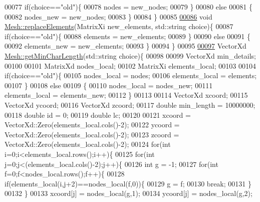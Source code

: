 \begin{DoxyCode}
00077     \textcolor{keywordflow}{if}(choice==\textcolor{stringliteral}{"old"})\{
00078         nodes = new\_nodes;
00079     \}
00080     \textcolor{keywordflow}{else}
00081     \{
00082         nodes\_new = new\_nodes;
00083     \}
00084 \}
00085 
\hyperlink{class_mesh_a95ba7a96ec42ea4e0c191890f7faa2ab}{00086} \textcolor{keywordtype}{void} \hyperlink{class_mesh_a95ba7a96ec42ea4e0c191890f7faa2ab}{Mesh::replaceElements}(MatrixXi new\_elements, std::string choice)\{
00087     \textcolor{keywordflow}{if}(choice==\textcolor{stringliteral}{"old"})\{
00088         elements = new\_elements;
00089     \}
00090     \textcolor{keywordflow}{else}
00091     \{
00092         elements\_new = new\_elements;
00093     \}
00094 \}
00095 
\hyperlink{class_mesh_a94ce58cb2598b1db2973ad357dae2710}{00097} VectorXd \hyperlink{class_mesh_a94ce58cb2598b1db2973ad357dae2710}{Mesh::getMinCharLength}(std::string choice)\{
00098 
00099     VectorXd min\_details;
00100 
00101     MatrixXd nodes\_local;
00102     MatrixXi elements\_local;
00103 
00104     \textcolor{keywordflow}{if}(choice==\textcolor{stringliteral}{"old"})\{
00105         nodes\_local = nodes;
00106         elements\_local = elements;
00107     \}
00108     \textcolor{keywordflow}{else}
00109     \{
00110         nodes\_local = nodes\_new;
00111         elements\_local = elements\_new;
00112     \}
00113 
00114     VectorXd xcoord;
00115     VectorXd ycoord;
00116     VectorXd zcoord;
00117     \textcolor{keywordtype}{double} min\_length = 10000000;
00118     \textcolor{keywordtype}{double} \textcolor{keywordtype}{id} = 0;
00119     \textcolor{keywordtype}{double} lc;
00120 
00121     xcoord = VectorXd::Zero(elements\_local.cols()-2);
00122     ycoord = VectorXd::Zero(elements\_local.cols()-2);
00123     zcoord = VectorXd::Zero(elements\_local.cols()-2);
00124     \textcolor{keywordflow}{for}(\textcolor{keywordtype}{int} i=0;i<elements\_local.rows();i++)\{
00125         \textcolor{keywordflow}{for}(\textcolor{keywordtype}{int} j=0;j<(elements\_local.cols()-2);j++)\{
00126             \textcolor{keywordtype}{int} g = -1;
00127             \textcolor{keywordflow}{for}(\textcolor{keywordtype}{int} f=0;f<nodes\_local.rows();f++)\{
00128                 \textcolor{keywordflow}{if}(elements\_local(i,j+2)==nodes\_local(f,0))\{
00129                     g = f;
00130                     \textcolor{keywordflow}{break};
00131                 \}
00132             \}
00133             xcoord[j] = nodes\_local(g,1);
00134             ycoord[j] = nodes\_local(g,2);

\end{DoxyCode}
